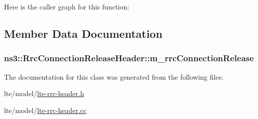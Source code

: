 Here is the caller graph for this function\+:




\subsection{Member Data Documentation}
\subsubsection[{\texorpdfstring{m\+\_\+rrc\+Connection\+Release}{m_rrcConnectionRelease}}]{ ns3\+::\+Rrc\+Connection\+Release\+Header\+::m\+\_\+rrc\+Connection\+Release\hspace{0.3cm}{\ttfamily [private]}}\hypertarget{classns3_1_1RrcConnectionReleaseHeader_af5b75bfe8c9734280de8393550954dad}{}\label{classns3_1_1RrcConnectionReleaseHeader_af5b75bfe8c9734280de8393550954dad}


The documentation for this class was generated from the following files\+:\begin{DoxyCompactItemize}
\item 
lte/model/\hyperlink{lte-rrc-header_8h}{lte-\/rrc-\/header.\+h}\item 
lte/model/\hyperlink{lte-rrc-header_8cc}{lte-\/rrc-\/header.\+cc}\end{DoxyCompactItemize}

